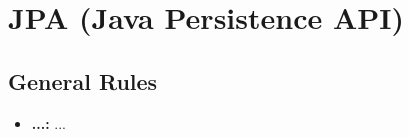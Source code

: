 
\section*{JPA (Java Persistence API)}

\subsection*{General Rules}
\begin{itemize}
    \item \textbf{...:} ...
\end{itemize}
